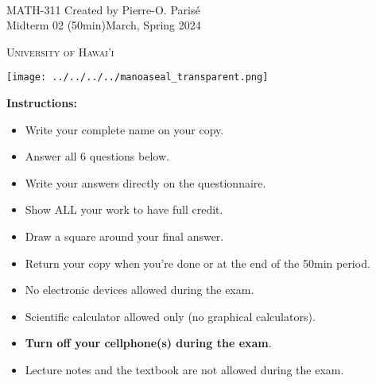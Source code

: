 \documentclass[addpoints, 12pt]{exam}%
\theoremstyle{definition}
\begin{document}
	\noindent \hrulefill \\
	\noindent MATH-311 \hfill Created by Pierre-O. Paris{\'e}\\
	Midterm 02 (50min)\hfill March, Spring 2024\\\vspace*{-0.7cm}

\noindent\hrulefill

\vspace*{0.5cm}

\begin{center}
\begin{minipage}{0.6\textwidth}
\begin{Huge}
\textsc{University of Hawai'i}
\end{Huge}
\end{minipage}
\begin{minipage}{0.12\textwidth}
\texttt{[image: ../../../../manoaseal\_transparent.png]}
\end{minipage}
\end{center}
	
\vspace*{0.5cm}

\noindent{}

\vspace*{0.5cm}

\noindent{}

\vspace*{1cm}

\begin{center}
\gradetable[h][questions]
\end{center}

\vspace*{1cm}

\noindent\textbf{Instructions:} 

\begin{itemize}
\item Write your complete name on your copy. 
\item Answer all 6 questions below.
\item Write your answers directly on the questionnaire.
\item Show ALL your work to have full credit.
\item Draw a square around your final answer.
\item Return your copy when you're done or at the end of the 50min period. 
\item No electronic devices allowed during the exam. 
\item Scientific calculator allowed only (no graphical calculators).
\item \textbf{Turn off your cellphone(s) during the exam}.
\item Lecture notes and the textbook are not allowed during the exam. 
\end{itemize}
\end{document}
